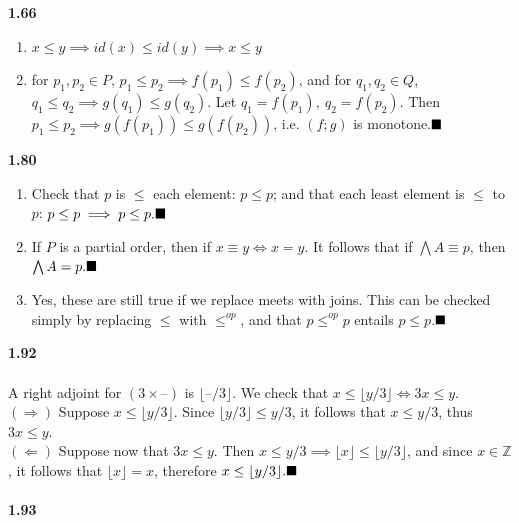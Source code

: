 \documentclass{article}
\begin{document}
\textbf{1.66}\bigskip
\begin{enumerate}
	\item $x\leq y\implies id(x)\leq id(y)\implies x\leq y$
	\item for $p_1,p_2\in P$, $p_1\leq p_2 \implies f(p_1)\leq f(p_2)$, and for $q_1,q_2\in Q$, $q_1\leq q_2 \implies g(q_1)\leq g(q_2)$. Let $q_1=f(p_1), \ q_2=f(p_2)$. Then $p_1\leq p_2\implies g(f(p_1))\leq g(f(p_2))$, i.e. $(f;g)$ is monotone.$\hfill\blacksquare$
\end{enumerate}\bigskip
\textbf{1.80}
\begin{enumerate}
	\item Check that $p$ is $\leq$ each element: $p\leq p$; and that each least element is $\leq$ to $p$: $p\leq p \implies p\leq p.\hfill\blacksquare$
	\item If $P$ is a partial order, then if $x\equiv y\iff x=y$. It follows that if $\bigwedge A\equiv p$, then $\bigwedge A=p.\hfill\blacksquare$
	\item Yes, these are still true if we replace meets with joins. This can be checked simply by replacing $\leq$ with $\leq^{op}$, and that $p\leq^{op} p$ entails $p\leq p$.$\hfill\blacksquare$
\end{enumerate}\bigskip
\textbf{1.92}\\
 \\
A right adjoint for $(3\times –)$ is $\lfloor –/3 \rfloor$. We check that $x\leq \lfloor y/3\rfloor\iff 3x\leq y$. \\
$\left(\Rightarrow\right)$ Suppose $x\leq\lfloor y/3\rfloor$. Since $\lfloor y/3\rfloor\leq y/3$, it follows that $x\leq y/3$, thus $3x\leq y$.\\
$\left(\Leftarrow\right)$ Suppose now that $3x\leq y$. Then $x\leq y/3 \implies \lfloor x\rfloor\leq \lfloor y/3\rfloor$, and since $x\in\mathbb{Z}$, it follows that $\lfloor x\rfloor=x$, therefore $x\leq\lfloor y/3\rfloor .\hfill\blacksquare$\\
 \\
\textbf{1.93}
\end{document}
